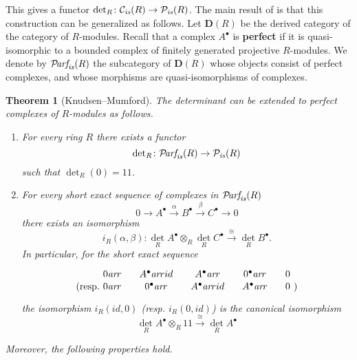 \documentclass[10pt,a4paper,oneside,draft]{article}
\newcommand{\bone}{1\!\!1}
\newcommand{\Parf}{\mathcal{P}\!\text{\it arf}}
\renewcommand{\det}{\operatorname{det}}
\newcommand{\ar}{\text{\it ar}}
\newcommand{\is}{\text{\it is}}
\theoremstyle{myplain}
\newtheorem{theorem}{Theorem}[section]
\theoremstyle{mydefinition}
\numberwithin{equation}{section}
\begin{document}
\begin{appendices}
This gives a functor $\det_R\colon \mathcal{C}_\is (R) \to \mathcal{P}_\is (R)$.
The main result of \cite[Chapter~I]{Knudsen-Mumford-1976} is that this
construction can be generalized as follows. Let $\mathbf{D} (R)$ be the derived
category of the category of $R$-modules. Recall that a complex $A^\bullet$ is
\textbf{perfect} if it is quasi-isomorphic to a bounded complex of finitely
generated projective $R$-modules. We denote by $\Parf_\is (R)$ the subcategory
of $\mathbf{D} (R)$ whose objects consist of perfect complexes, and whose
morphisms are quasi-isomorphisms of complexes.

\begin{theorem}[Knudsen--Mumford]
  The determinant can be extended to perfect complexes of $R$-modules as
  follows.

  \begin{enumerate}
  \item[I)] For every ring $R$ there exists a functor
    $$\det_R\colon \Parf_\is (R) \to \mathcal{P}_\is (R)$$
    such that $\det_R (0) = \bone$.

  \item[II)] For every short exact sequence of complexes in $\Parf_\is (R)$
    \[ 0 \to A^\bullet \xrightarrow{\alpha} B^\bullet
      \xrightarrow{\beta} C^\bullet \to 0 \]
    there exists an isomorphism
    \[ i_R (\alpha,\beta)\colon
      \det_R A^\bullet \otimes_R \det_R C^\bullet
      \xrightarrow{\cong} \det_R B^\bullet. \]
    In particular, for the short exact sequence
    \[ \begin{tikzcd}[column sep=1em]
        &[-1.5em] 0 \ar{r} & A^\bullet \ar{r}{id} & A^\bullet \ar{r} & 0^\bullet \ar{r} & 0 &[-1.5em] \\[-2em]
        \text{(resp.} & 0 \ar{r} & 0^\bullet \ar{r} & A^\bullet \ar{r}{id} & A^\bullet \ar{r} & 0 & \text{)}
      \end{tikzcd} \]
    the isomorphism $i_R (id,0)$ (resp. $i_R (0,id)$) is the canonical isomorphism
    $$\det_R A^\bullet \otimes_R \bone \xrightarrow{\cong} \det_R A^\bullet$$
  \end{enumerate}

  Moreover, the following properties hold.


\end{theorem}
\end{appendices}
\end{document}
